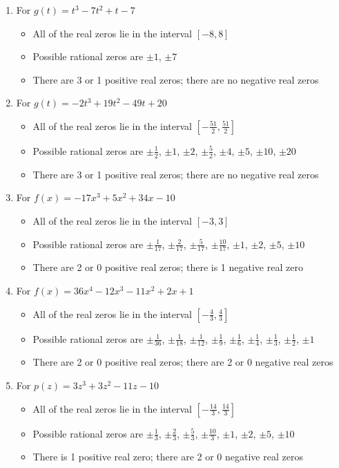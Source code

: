 \documentclass{ximera}
\begin{document}
\begin{enumerate}
\item For   $g(t) = t^{3} - 7t^{2} + t - 7$
\begin{itemize}
\item  All of the real zeros lie in the interval $[-8,8]$
\item  Possible rational zeros are $\pm 1$, $\pm 7$
\item  There are 3 or 1 positive real zeros;  there are no negative real zeros
\end{itemize}

\item For   $g(t) = -2t^{3} + 19t^{2} - 49t + 20$
\begin{itemize}
\item  All of the real zeros lie in the interval $\left[-\frac{51}{2},\frac{51}{2} \right]$
\item  Possible rational zeros are  $\pm \frac{1}{2}$, $\pm 1$, $\pm 2$, $\pm \frac{5}{2}$, $\pm 4$, $\pm 5$, $\pm 10$, $\pm 20$ 
\item  There are 3 or 1 positive real zeros;  there are no negative real zeros
\end{itemize}

\item For   $f(x) = -17x^{3} + 5x^{2} + 34x - 10$
\begin{itemize}
\item  All of the real zeros lie in the interval $[-3,3]$
\item  Possible rational zeros are $\pm \frac{1}{17}$, $\pm \frac{2}{17}$, $\pm \frac{5}{17}$, $\pm \frac{10}{17}$, $\pm 1$, $\pm 2$, $\pm 5$, $\pm 10$
\item  There are 2 or 0 positive real zeros;  there is 1 negative real zero
\end{itemize}

\item For   $f(x) = 36x^{4} - 12x^{3} - 11x^{2} + 2x + 1$
\begin{itemize}
\item  All of the real zeros lie in the interval $\left[-\frac{4}{3},\frac{4}{3}\right]$
\item  Possible rational zeros are $\pm \frac{1}{36}$, $\pm \frac{1}{18}$, $\pm \frac{1}{12}$, $\pm \frac{1}{9}$, $\pm \frac{1}{6}$, $\pm \frac{1}{4}$, $\pm \frac{1}{3}$, $\pm \frac{1}{2}$, $\pm 1$
\item  There are 2 or 0 positive real zeros;  there are 2 or 0 negative real zeros
\end{itemize}

\item For   $p(z) = 3z^{3} + 3z^{2} - 11z - 10$
\begin{itemize}
\item  All of the real zeros lie in the interval $\left[-\frac{14}{3},\frac{14}{3}\right]$
\item  Possible rational zeros are $\pm \frac{1}{3}$, $\pm \frac{2}{3}$, $\pm \frac{5}{3}$, $\pm \frac{10}{3}$, $\pm 1$, $\pm 2$, $\pm 5$, $\pm 10$
\item  There is 1 positive real zero;  there are 2 or 0 negative real zeros
\end{itemize}


\end{enumerate}
\end{document}
